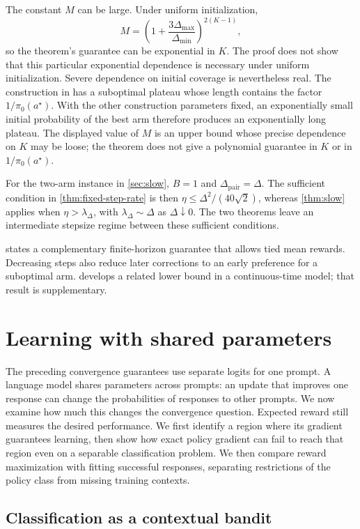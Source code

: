 \documentclass[11pt,twoside]{article}
\theoremstyle{definition}
\theoremstyle{remark}
\begin{document}
The constant $M$ can be large. Under uniform initialization,
\[
 M=\left(1+\frac{3\Delta_{\max}}{\Delta_{\min}}
 \right)^{2(K-1)},
\]
so the theorem's guarantee can be exponential in $K$. The proof does not show
that this particular exponential dependence is necessary under uniform
initialization. Severe dependence on initial coverage is nevertheless real.
The construction in \citet[Theorem~5.6]{mei2024} has a suboptimal plateau
whose length contains the factor $1/\pi_0(a^\star)$. With the other
construction parameters fixed, an exponentially small initial probability
of the best arm therefore produces an exponentially long plateau. The
displayed value of $M$ is an upper bound whose precise dependence on $K$ may
be loose; the theorem does not give a polynomial guarantee in $K$ or in
$1/\pi_0(a^\star)$.

For the two-arm instance in \cref{sec:slow}, $B=1$ and
$\Delta_{\mathrm{pair}}=\Delta$.
The sufficient condition in \cref{thm:fixed-step-rate} is then
$\eta\le\Delta^2/(40\sqrt2)$, whereas \cref{thm:slow} applies when
$\eta>\lambda_\Delta$, with $\lambda_\Delta\sim\Delta$ as
$\Delta\downarrow0$. The two theorems leave an intermediate stepsize regime
between these sufficient conditions.

 states a complementary finite-horizon guarantee that
allows tied mean rewards. Decreasing steps also reduce later corrections to
an early preference for a suboptimal arm.  develops a
related lower bound in a continuous-time model; that result is supplementary.

\section{Learning with shared parameters}
\label{sec:sharing}

The preceding convergence guarantees use separate logits for one prompt.
A language model shares parameters across prompts: an update that improves
one response can change the probabilities of responses to other prompts.
We now examine how much this changes the convergence question. Expected
reward still measures the desired performance. We first identify a region
where its gradient guarantees learning, then show how exact policy gradient
can fail to reach that region even on a separable classification problem.
We then compare reward maximization with fitting successful responses,
separating restrictions of the policy class from missing training contexts.

\subsection{Classification as a contextual bandit}
\end{document}
